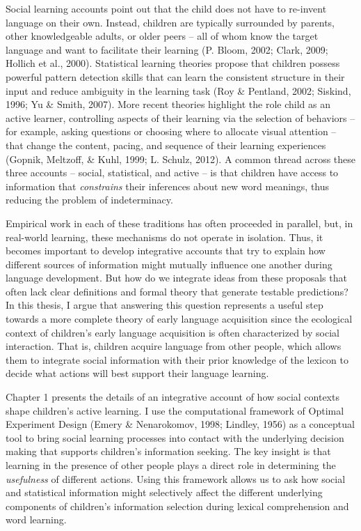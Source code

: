 \documentclass[oneside]{report}
\begin{document}
Social learning accounts point out that the child does not have to
re-invent language on their own. Instead, children are typically
surrounded by parents, other knowledgeable adults, or older peers -- all
of whom know the target language and want to facilitate their learning
(P. Bloom, 2002; Clark, 2009; Hollich et al., 2000). Statistical
learning theories propose that children possess powerful pattern
detection skills that can learn the consistent structure in their input
and reduce ambiguity in the learning task (Roy \& Pentland, 2002;
Siskind, 1996; Yu \& Smith, 2007). More recent theories highlight the
role child as an active learner, controlling aspects of their learning
via the selection of behaviors -- for example, asking questions or
choosing where to allocate visual attention -- that change the content,
pacing, and sequence of their learning experiences (Gopnik, Meltzoff, \&
Kuhl, 1999; L. Schulz, 2012). A common thread across these three
accounts -- social, statistical, and active -- is that children have
access to information that \emph{constrains} their inferences about new
word meanings, thus reducing the problem of indeterminacy.

Empirical work in each of these traditions has often proceeded in
parallel, but, in real-world learning, these mechanisms do not operate
in isolation. Thus, it becomes important to develop integrative accounts
that try to explain how different sources of information might mutually
influence one another during language development. But how do we
integrate ideas from these proposals that often lack clear definitions
and formal theory that generate testable predictions? In this thesis, I
argue that answering this question represents a useful step towards a
more complete theory of early language acquisition since the ecological
context of children's early language acquisition is often characterized
by social interaction. That is, children acquire language from other
people, which allows them to integrate social information with their
prior knowledge of the lexicon to decide what actions will best support
their language learning.

Chapter 1 presents the details of an integrative account of how social
contexts shape children's active learning. I use the computational
framework of Optimal Experiment Design (Emery \& Nenarokomov, 1998;
Lindley, 1956) as a conceptual tool to bring social learning processes
into contact with the underlying decision making that supports
children's information seeking. The key insight is that learning in the
presence of other people plays a direct role in determining the
\emph{usefulness} of different actions. Using this framework allows us
to ask how social and statistical information might selectively affect
the different underlying components of children's information selection
during lexical comprehension and word learning.
\end{document}
